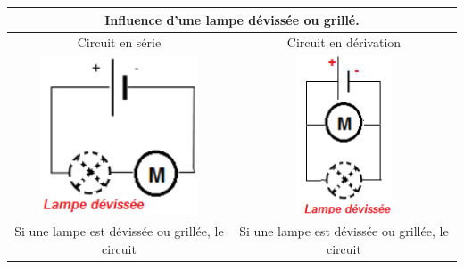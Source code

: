 \documentclass[10pt]{article}
\begin{document}
	\begin{tabular}{cc} \toprule
		\multicolumn{2}{c}{Influence d'une lampe dévissée ou grillé.} \\ \midrule
		Circuit en série & Circuit en dérivation\\ \midrule
		\includegraphics[width=0.2\columnwidth]{disfonctionne1.png} 
								& \includegraphics[width=0.12\columnwidth]{disfonctionne2.png} \\
		\parbox[t]{0.47\textwidth}{
			Si une lampe est dévissée ou grillée, le circuit \vspace{10pt}}
								& \parbox[t]{0.47\textwidth}{
									Si une lampe est dévissée ou grillée, le circuit \vspace{10pt}
									} \\
	\end{tabular}
\end{document}
